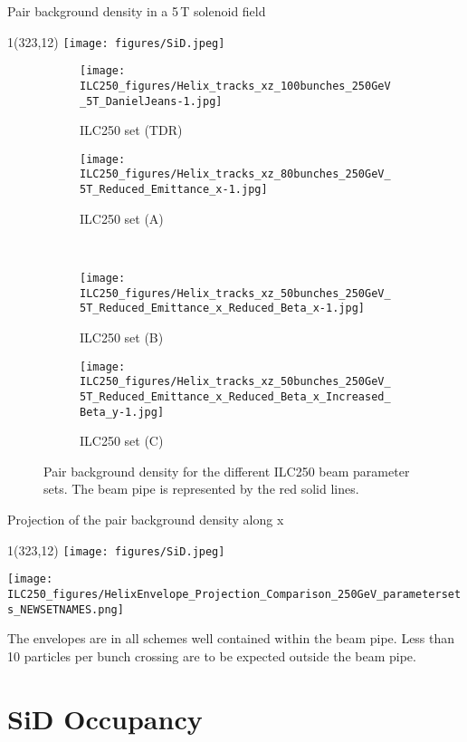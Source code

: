 \documentclass[xcolor={dvipsnames}]{beamer}
\newcommand{\sidlogo}{
  \setlength{\TPHorizModule}{1pt}
  \setlength{\TPVertModule}{1pt}
  \begin{textblock}{1}(323,12)
   \texttt{[image: figures/SiD.jpeg]}
  \end{textblock}
  }
\begin{document}
\begin{frame}{Pair background density in a 5\,T solenoid field}
\sidlogo
 \begin{figure}
\centering
\begin{subfigure}[t]{0.35\textwidth}
\centering
\texttt{[image: ILC250\_figures/Helix\_tracks\_xz\_100bunches\_250GeV\_5T\_DanielJeans-1.jpg]}
\caption{ILC250 set (TDR)}
\end{subfigure}
\hspace*{0.1cm}
\begin{subfigure}[t]{0.35\textwidth}
\centering
\texttt{[image: ILC250\_figures/Helix\_tracks\_xz\_80bunches\_250GeV\_5T\_Reduced\_Emittance\_x-1.jpg]}
\caption{ILC250 set (A)}
\end{subfigure}
\\
\begin{subfigure}[t]{0.35\textwidth}
\centering
\texttt{[image: ILC250\_figures/Helix\_tracks\_xz\_50bunches\_250GeV\_5T\_Reduced\_Emittance\_x\_Reduced\_Beta\_x-1.jpg]}
\caption{ILC250 set (B)}
\end{subfigure}
\hspace*{0.1cm}
\begin{subfigure}[t]{0.35\textwidth}
\centering
\texttt{[image: ILC250\_figures/Helix\_tracks\_xz\_50bunches\_250GeV\_5T\_Reduced\_Emittance\_x\_Reduced\_Beta\_x\_Increased\_Beta\_y-1.jpg]}
\caption{ILC250 set (C)}
\end{subfigure}
\caption{Pair background density for the different ILC250 beam parameter sets.
The beam pipe is represented by the red solid lines.}
\label{fig:Envelopes}
\end{figure}

\end{frame}

\begin{frame}{Projection of the pair background density along x}
\sidlogo
\begin{center}
 \texttt{[image: ILC250\_figures/HelixEnvelope\_Projection\_Comparison\_250GeV\_parametersets\_NEWSETNAMES.png]}
\end{center}
The envelopes are in all schemes well contained within the beam pipe. Less than 10 particles per bunch crossing are to be expected outside the beam pipe.
\end{frame}

\section{SiD Occupancy}
\end{document}

